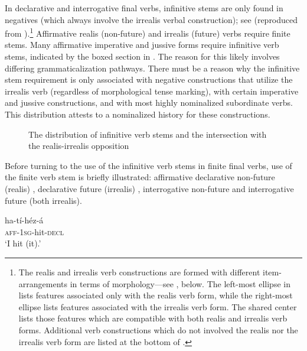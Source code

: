 \documentclass[output=paper]{langsci/langscibook}
\begin{document}
In declarative and interrogative final verbs, infinitive stems are only found in negatives (which always involve the irrealis verbal construction); see  (reproduced from \citealt[266]{AhlandM2012}).\footnote{The realis and irrealis verb constructions are formed with different item-arrangements in terms of morphology—see , below. The left-most ellipse in  lists features associated only with the realis verb form, while the right-most ellipse lists features associated with the irrealis verb form. The shared center lists those features which are compatible with both realis and irrealis verb forms. Additional verb constructions which do not involved the realis nor the irrealis verb form are listed at the bottom of .} Affirmative realis (non-future) and irrealis (future) verbs require finite stems. Many affirmative imperative and jussive forms require infinitive verb stems, indicated by the boxed section in . The reason for this likely involves differing grammaticalization pathways. There must be a reason why the infinitive stem requirement is only associated with negative constructions that utilize the irrealis verb (regardless of morphological tense marking), with certain imperative and jussive constructions, and with most highly nominalized subordinate verbs. This distribution attests to a nominalized history for these constructions. 
 

\begin{sidewaysfigure}
\resizebox{\textwidth}{!}{}
\caption{The distribution of infinitive verb stems and the intersection with the realis-irrealis opposition}
\label{fig:2}
\end{sidewaysfigure}


Before turning to the use of the infinitive verb stems in finite final verbs, use of the finite verb stem is briefly illustrated: affirmative declarative non-future (realis) , declarative future (irrealis) , interrogative non-future  and interrogative future  (both irrealis).

\ea\label{ex:mahland:52}
\gll ha-tí-héz-{\downstep}á\\
\textsc{aff-1sg}{}-hit-\textsc{decl} \\
\glt `I hit (it).'
\z
\end{document}
